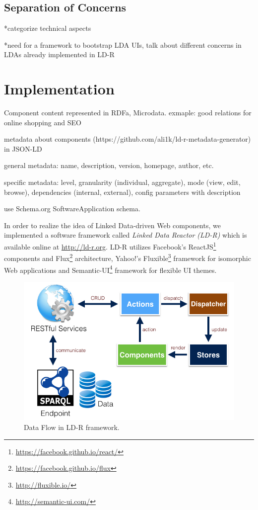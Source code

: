 \documentclass{acm_proc_article-sp}
\begin{document}
\subsection{Separation of Concerns}
*categorize technical aspects

*need for a framework to bootstrap LDA UIs, talk about different concerns in LDAs already implemented in LD-R


\section{Implementation}

Component content represented in RDFa, Microdata. exmaple: good relations for online shopping and SEO

metadata about components (https://github.com/ali1k/ld-r-metadata-generator) in JSON-LD

general metadata: name, description, version, homepage, author, etc.

specific metadata: level, granularity (individual, aggregate), mode (view, edit, browse), dependencies (internal, external), config parameters with description

use Schema.org SoftwareApplication schema.

In order to realize the idea of Linked Data-driven Web components, we implemented a software framework called \emph{Linked Data Reactor (LD-R)} which is available online at \url{http://ld-r.org}.
LD-R utilizes Facebook's ReactJS\footnote{\url{https://facebook.github.io/react/}} components and Flux\footnote{\url{https://facebook.github.io/flux}} architecture, Yahoo!'s Fluxible\footnote{\url{http://fluxible.io/}} framework for isomorphic Web applications and Semantic-UI\footnote{\url{http://semantic-ui.com/}} framework for flexible UI themes.


\begin{figure}[tb]
  \includegraphics[width=.9\linewidth]{images/dataflow.jpg}
  \caption{Data Flow in LD-R framework.}
  \label{fig:dataflow}
\end{figure}
\end{document}
